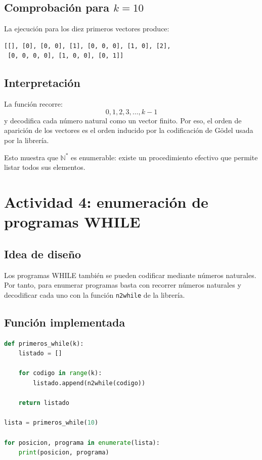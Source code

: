 \documentclass[11pt,a4paper]{article}
\begin{document}
\subsection{Comprobación para $k=10$}
La ejecución para los diez primeros vectores produce:

\begin{lstlisting}
[[], [0], [0, 0], [1], [0, 0, 0], [1, 0], [2],
 [0, 0, 0, 0], [1, 0, 0], [0, 1]]
\end{lstlisting}

\subsection{Interpretación}
La función recorre:
\[
0,1,2,3,\ldots,k-1
\]
y decodifica cada número natural como un vector finito. Por eso, el orden de aparición de los vectores es el orden inducido por la codificación de Gödel usada por la librería.

Esto muestra que $\mathbb{N}^{*}$ es enumerable: existe un procedimiento efectivo que permite listar todos sus elementos.

\section{Actividad 4: enumeración de programas WHILE}

\subsection{Idea de diseño}
Los programas WHILE también se pueden codificar mediante números naturales. Por tanto, para enumerar programas basta con recorrer números naturales y decodificar cada uno con la función \texttt{n2while} de la librería.

\subsection{Función implementada}
\begin{lstlisting}[language=Python]
def primeros_while(k):
    listado = []

    for codigo in range(k):
        listado.append(n2while(codigo))

    return listado

lista = primeros_while(10)

for posicion, programa in enumerate(lista):
    print(posicion, programa)
\end{lstlisting}
\end{document}
